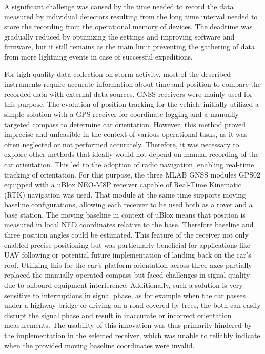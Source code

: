 A significant challenge was caused by the time needed to record the data measured by individual detectors resulting from the long time interval needed to store the recording from the operational memory of devices. The deadtime was gradually reduced by optimizing the settings and improving software and firmware, but it still remains as the main limit preventing the gathering of data from more lightning events in case of successful expeditions.  

For high-quality data collection on storm activity, most of the described instruments require accurate information about time and position to compare the recorded data with external data sources.
GNSS receivers were mainly used for this purpose. The evolution of position tracking for the vehicle initially utilized a simple solution with a GPS receiver for coordinate logging and a manually targeted compass to determine car orientation. However, this method proved imprecise and unfeasible in the context of various operational tasks, as it was often neglected or not performed accurately.
Therefore, it was necessary to explore other methods that ideally would not depend on manual recording of the car orientation. This led to the adoption of radio navigation, enabling real-time tracking of orientation. For this purpose, the three MLAB GNSS modules GPS02 equipped with a uBlox NEO-M8P receiver capable of Real-Time Kinematic (RTK) navigation was used. That module at the same time supports moving baseline configurations, allowing each receiver to be used both as a rover and a base station. The moving baseline in context of uBlox means that position is measured in local NED coordinates relative to the base. Therefore baseline and three position angles could be estimated. 
This feature of the receiver not only enabled precise positioning but was particularly beneficial for applications like UAV following or potential future implementation of landing back on the car's roof. Utilizing this for the car's platform orientation across three axes partially replaced the manually operated compass but faced challenges in signal quality due to onboard equipment interference. Additionally, such a solution is very sensitive to interruptions in signal phase, as for example when the car passes under a highway bridge or driving on a road covered by trees, the both can easily disrupt the signal phase and result in inaccurate or incorrect orientation measurements. The usability of this innovation was thus primarily hindered by the implementation in the selected receiver, which was unable to reliably indicate when the provided moving baseline coordinates were invalid.

